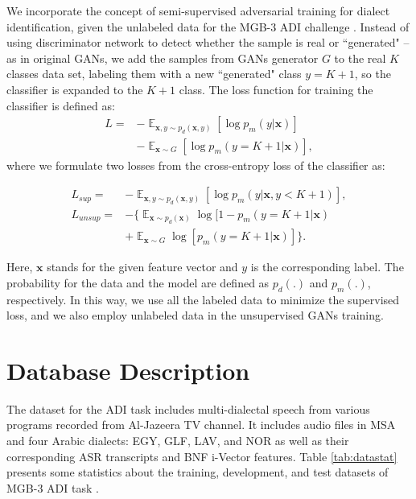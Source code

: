 \documentclass{article}
\DeclareMathOperator{\E}{\mathbb{E}}
\begin{document}
We incorporate the concept of semi-supervised adversarial training for dialect identification, given the unlabeled data for the MGB-3 ADI challenge \cite{zhang2017letters}. Instead of using discriminator network to detect whether the sample is real or ``generated" -- as in original GANs, we add the samples from GANs generator $G$ to the real $K$ classes data set, labeling them with a new ``generated" class $y=K+1$, so the classifier is expanded to the $K+1$ class. The loss function for training the classifier is defined as:
\begin{equation}\label{eg:GANsloss}
\begin{aligned}
L   = &-\E_{\mathbf{x},y \sim p_{d}(\mathbf{x},y)}[\log p_{m}(y|\mathbf{x})]  \\
 &-\E_{\mathbf{x} \sim G}[\log p_{m}(y=K+1|\mathbf{x})],
\end{aligned}
\end{equation}           
where we formulate two losses from the cross-entropy loss of the classifier as:

\vspace*{-5pt}
\begin{align}
 L_{sup} = &-\E_{\mathbf{x},y \sim p_{d}(\mathbf{x},y)}[\log p_{m}(y|\mathbf{x},{y<K+1})] \label{eq:GANsLsup},\\
 L_{unsup} = &-\{\E_{\mathbf{x}\sim p_{d}(\mathbf{x})}\log [1- p_{m}({y=K+1}|\mathbf{x}) \label{eq:GANsLunsup} \\
 &+ \E_{\mathbf{x} \sim G}\log [p_{m}(y=K+1|\mathbf{x})]\}.  \nonumber
\end{align}
 

\noindent Here, $\mathbf{x}$ stands for the given feature vector and $y$ is the corresponding label. The probability for the data and the model are defined as $p_{d}(.)$ and $p_{m}(.)$, respectively. In this way, we use all the labeled data to minimize the supervised loss, and we also employ unlabeled data in the unsupervised GANs training.


\section{Database Description}
\label{sec:database}
The dataset for the ADI task includes multi-dialectal speech from various programs recorded from Al-Jazeera TV channel. It includes audio files in MSA and four Arabic dialects: EGY, GLF, LAV, and NOR as well as their corresponding ASR transcripts and BNF i-Vector features. Table \ref{tab:datastat} presents some statistics about the training, development, and test datasets of MGB-3 ADI task \cite{Ali2017mgb3}.
\end{document}
